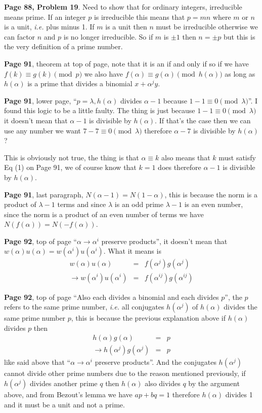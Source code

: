 \documentclass[aps,preprint,preprintnumbers,nofootinbib,showpacs,prd]{revtex4-1}
\newcommand{\ie}{{\it i.e.} }
\newcommand{\nbea}{\begin{eqnarray*}}
\newcommand{\neea}{\end{eqnarray*}}
\begin{document}
{\bf Page 88, Problem 19}. Need to show that for ordinary integers, irreducible means prime. If an integer $p$ is irreducible this means that $p = mn$ where $m$ or $n$ is a unit, \ie plus minus 1. If $m$ is a unit then $n$ must be irreducible otherwise we can factor $n$ and $p$ is no longer irreducible. So if $m$ is $\pm1$ then $n = \pm p$ but this is the very definition of a prime number.

{\bf Page 91}, theorem at top of page, note that it is an if and only if so if we have $f(k) \equiv g(k) \pmod{p}$ we also have $f(\alpha) \equiv g(\alpha) \pmod{h(\alpha)}$ as long as $h(\alpha)$ is a prime that divides a binomial $x + \alpha^j y$.

{\bf Page 91}, lower page, ``$p = \lambda, h(\alpha)$ divides $\alpha - 1$ because $1-1 \equiv 0 \pmod{\lambda}$''. I found this logic to be a little faulty. The thing is just because $1 - 1 \equiv 0 \pmod{\lambda}$ it doesn't mean that $\alpha - 1$ is divisible by $h(\alpha)$. If that's the case then we can use any number we want $7 - 7 \equiv 0 \pmod{\lambda}$ therefore $\alpha - 7$ is divisible by $h(\alpha)$?

This is obviously not true, the thing is that $\alpha \equiv k$ also means that $k$ must satisfy Eq (1) on Page 91, we of course know that $k=1$ does therefore $\alpha - 1$ is divisible by $h(\alpha)$.

{\bf Page 91}, last paragraph, $N(\alpha - 1) = N(1 - \alpha)$, this is because the norm is a product of $\lambda - 1$ terms and since $\lambda$ is an odd prime $\lambda - 1$ is an even number, since the norm is a product of an even number of terms we have $N(f(\alpha)) = N(-f(\alpha))$.

{\bf Page 92}, top of page ``$\alpha \to \alpha^i$ preserve products'', it doesn't mean that $w(\alpha)u(\alpha) = w(\alpha^i)u(\alpha^i)$. What it means is
%
\nbea
w(\alpha)u(\alpha) & = & f(\alpha^j)g(\alpha^j) \\
\to w(\alpha^i)u(\alpha^i) & = & f(\alpha^{ij})g(\alpha^{ij})
\neea
%

{\bf Page 92}, top of page ``Also each divides a binomial and each divides $p$'', the $p$ refers to the same prime number, \ie all conjugates $h(\alpha^j)$ of $h(\alpha)$ divides the same prime number $p$, this is because the previous explanation above if $h(\alpha)$ divides $p$ then
%
\nbea
h(\alpha) g(\alpha) & = & p \\
\to h(\alpha^j) g(\alpha^j) & = & p
\neea
%
like said above that ``$\alpha \to \alpha^i$ preserve products''. And the conjugates $h(\alpha^j)$ cannot divide other prime numbers due to the reason mentioned previously, if $h(\alpha^j)$ divides another prime $q$ then $h(\alpha)$ also divides $q$ by the argument above, and from Bezout's lemma we have $ap + bq = 1$ therefore $h(\alpha)$ divides 1 and it must be a unit and not a prime. 
\end{document}
